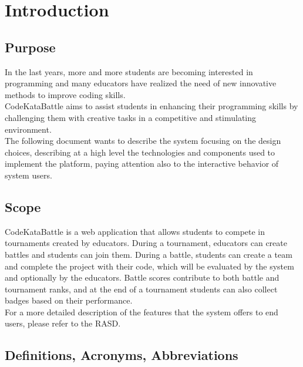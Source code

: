 \chapter{Introduction}

\section{Purpose}
In the last years, more and more students are becoming interested in programming and many educators have realized 
the need of new innovative methods to improve coding skills. \\
CodeKataBattle aims to assist students in enhancing their programming skills by challenging them with creative tasks
 in a competitive and stimulating environment. \\
 The following document wants to describe the system focusing on the design choices, describing at a high level the technologies
  and components used to implement the platform, paying attention also to the interactive behavior of system users.\\
  
\section{Scope}
CodeKataBattle is a web application that allows students to compete in tournaments created by educators. During a tournament, educators 
can create battles and students can join them. During a battle, students can create a team and complete the project with their code, which 
will be evaluated by the system and optionally by the educators. Battle scores contribute to both battle and tournament ranks, and at the end 
of a tournament students can also collect badges based on their performance.\\
For a more detailed description of the features that the system offers to end users, please refer to the RASD.\\

\section{Definitions, Acronyms, Abbreviations}
